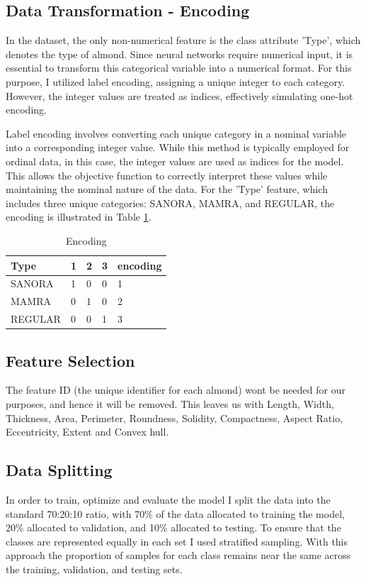 \documentclass[conference]{IEEEtran}
\begin{document}
\subsection{Data Transformation - Encoding}
In the dataset, the only non-numerical feature is the class attribute 'Type', which denotes the type of almond. Since neural networks require numerical input, it is essential to transform this categorical variable into a numerical format. For this purpose, I utilized label encoding, assigning a unique integer to each category. However, the integer values are treated as indices, effectively simulating one-hot encoding. 

Label encoding involves converting each unique category in a nominal variable into a corresponding integer value. While this method is typically employed for ordinal data, in this case, the integer values are used as indices for the model. This allows the objective function to correctly interpret these values while maintaining the nominal nature of the data. For the 'Type' feature, which includes three unique categories: SANORA, MAMRA, and REGULAR, the encoding is illustrated in Table \ref{tab:encoding_matrix}.

\begin{table}[h]
    \centering
    \caption{Encoding}
    \small
    \begin{tabular}{|p{1.5cm}|p{0.5cm}|p{0.5cm}|p{0.5cm}|p{1.1cm}|}
        \hline
        \textbf{Type} & \textbf{1} & \textbf{2} & \textbf{3} & \textbf{encoding} \\
        \hline
        SANORA    & 1 & 0 & 0 & 1\\
        \hline
        MAMRA     & 0 & 1 & 0 & 2\\
        \hline
        REGULAR 	 & 0 & 0 & 1 & 3\\
        \hline
    \end{tabular}
    \label{tab:encoding_matrix}
\end{table}

\subsection{Feature Selection}
The feature ID (the unique identifier for each almond) wont be needed for our purposes, and hence it will be removed. This leaves us with Length, Width, Thickness, Area, Perimeter, Roundness, Solidity, Compactness, Aspect Ratio, Eccentricity, Extent and Convex hull. 

\subsection{Data Splitting}
In order to train, optimize and evaluate the model I split the data into the standard 70:20:10 ratio, with 70\% of the data allocated to training the model, 20\% allocated to validation, and 10\% allocated to testing. To ensure that the classes are represented equally in each set I used stratified sampling. With this approach the proportion of samples for each class remains near the same across the training, validation, and testing sets.
\end{document}

